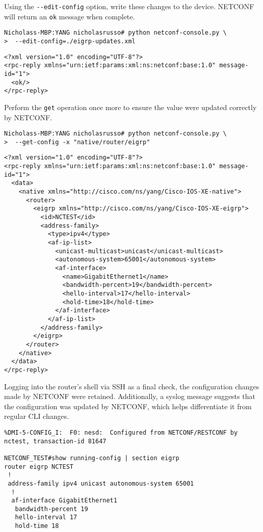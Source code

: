 Using the \verb|--edit-config| option, write these changes to the device. NETCONF
will return an \verb|ok| message when complete.

\begin{verbatim}
Nicholass-MBP:YANG nicholasrusso# python netconf-console.py \
>  --edit-config=./eigrp-updates.xml
\end{verbatim}

\begin{verbatim}
<?xml version="1.0" encoding="UTF-8"?>
<rpc-reply xmlns="urn:ietf:params:xml:ns:netconf:base:1.0" message-id="1">
  <ok/>
</rpc-reply>
\end{verbatim}

Perform the \verb|get| operation once more to ensure the value were updated
correctly by NETCONF\@.
 
\begin{verbatim}
Nicholass-MBP:YANG nicholasrusso# python netconf-console.py \
>  --get-config -x "native/router/eigrp"
\end{verbatim}

\begin{verbatim}
<?xml version="1.0" encoding="UTF-8"?>
<rpc-reply xmlns="urn:ietf:params:xml:ns:netconf:base:1.0" message-id="1">
  <data>
    <native xmlns="http://cisco.com/ns/yang/Cisco-IOS-XE-native">
      <router>
        <eigrp xmlns="http://cisco.com/ns/yang/Cisco-IOS-XE-eigrp">
          <id>NCTEST</id>
          <address-family>
            <type>ipv4</type>
            <af-ip-list>
              <unicast-multicast>unicast</unicast-multicast>
              <autonomous-system>65001</autonomous-system>
              <af-interface>
                <name>GigabitEthernet1</name>
                <bandwidth-percent>19</bandwidth-percent>
                <hello-interval>17</hello-interval>
                <hold-time>18</hold-time>
              </af-interface>
            </af-ip-list>
          </address-family>
        </eigrp>
      </router>
    </native>
  </data>
</rpc-reply>
\end{verbatim}

Logging into the router's shell via SSH as a final check, the configuration
changes made by NETCONF were retained. Additionally, a syslog message suggests
that the configuration was updated by NETCONF, which helps differentiate it
from regular CLI changes.

\begin{verbatim}
%DMI-5-CONFIG_I:  F0: nesd:  Configured from NETCONF/RESTCONF by nctest, transaction-id 81647

NETCONF_TEST#show running-config | section eigrp
router eigrp NCTEST
 !
 address-family ipv4 unicast autonomous-system 65001
  !
  af-interface GigabitEthernet1
   bandwidth-percent 19
   hello-interval 17
   hold-time 18
\end{verbatim}

